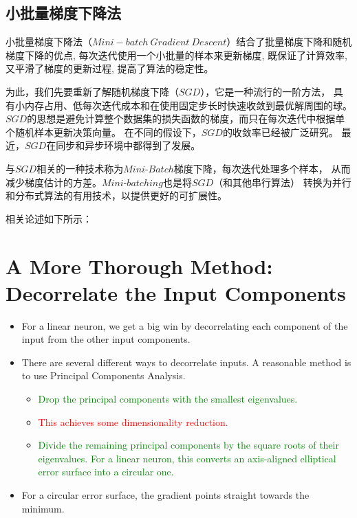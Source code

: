 \documentclass[printMode=false, declarePage=false]{ecnuthesis}
\begin{document}
    \subsection{小批量梯度下降法}
    小批量梯度下降法（$Mini-batch\ Gradient\ Descent$）结合了批量梯度下降和随机梯度下降的优点, 
    每次迭代使用一个小批量的样本来更新梯度, 既保证了计算效率, 
    又平滑了梯度的更新过程, 提高了算法的稳定性。

    为此，我们先要重新了解随机梯度下降（$SGD$），它是一种流行的一阶方法，
    具有小内存占用、低每次迭代成本和在使用固定步长时快速收敛到最优解周围的球。
    $SGD$的思想是避免计算整个数据集的损失函数的梯度，而只在每次迭代中根据单个随机样本更新决策向量。
    在不同的假设下，$SGD$的收敛率已经被广泛研究。
    最近，$SGD$在同步和异步环境中都得到了发展。

    与$SGD$相关的一种技术称为$Mini$-$Batch$梯度下降，每次迭代处理多个样本，
    从而减少梯度估计的方差。$Mini$-$batching$也是将$SGD$（和其他串行算法）
    转换为并行和分布式算法的有用技术，以提供更好的可扩展性。\cite{8264077}

    相关论述如下所示：

    \section*{A More Thorough Method: Decorrelate the Input Components\cite{hinton2012neural}}

    \begin{itemize}
        \item For a linear neuron, we get a big win by decorrelating each component of the input from the other input components.
        \item There are several different ways to decorrelate inputs. A reasonable method is to use Principal Components Analysis.
        \begin{itemize}
            \item \textcolor{green}{Drop the principal components with the smallest eigenvalues.}
            \item \textcolor{red}{This achieves some dimensionality reduction.}
            \item \textcolor{green}{Divide the remaining principal components by the square roots of their eigenvalues. For a linear neuron, this converts an axis-aligned elliptical error surface into a circular one.}
        \end{itemize}
        \item For a circular error surface, the gradient points straight towards the minimum.
    \end{itemize}
\end{document}
